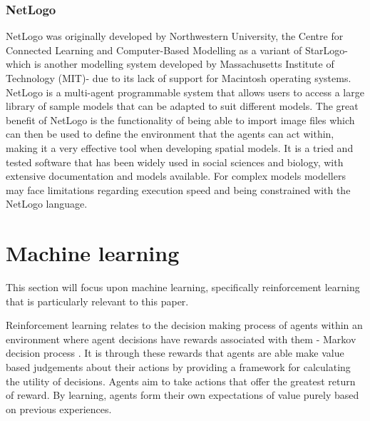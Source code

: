\documentclass[11pt]{informatics-report}
\begin{document}
\subsubsection{NetLogo}
NetLogo was originally developed by Northwestern University, the Centre for Connected Learning and Computer-Based Modelling as a variant of StarLogo- which is another modelling system developed by Massachusetts Institute of Technology (MIT)- due to its lack of support for Macintosh operating systems. NetLogo is a multi-agent programmable system that allows users to access a large library of sample models that can be adapted to suit different models. The great benefit of NetLogo is the functionality of being able to import image files which can then be used to define the environment that the agents can act within, making it a very effective tool when developing spatial models. It is a tried and tested software that has been widely used in social sciences and biology, with extensive documentation and models available. For complex models modellers may face limitations regarding execution speed and being constrained with the NetLogo language. 

\section{Machine learning}
This section will focus upon machine learning, specifically reinforcement learning that is particularly relevant to this paper. \par	

Reinforcement learning relates to the decision making process of agents within an environment where agent decisions have rewards associated with them - Markov decision process \cite{machine2002}. It is through these rewards that agents are able make value based judgements about their actions by providing a framework for calculating the utility of decisions. Agents aim to take actions that offer the greatest return of reward. By learning, agents form their own expectations of value purely based on previous experiences. \par
\end{document}
